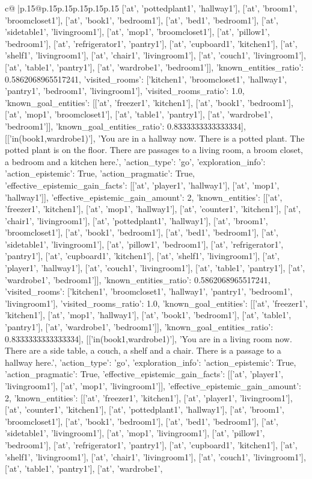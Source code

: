 \documentclass{article}
\begin{document}
{\begin{supertabular}{c@{$\;$}|p{.15\linewidth}@{}p{.15\linewidth}p{.15\linewidth}p{.15\linewidth}p{.15\linewidth}p{.15\linewidth}}
{{{['at', 'pottedplant1', 'hallway1'], ['at', 'broom1', 'broomcloset1'], ['at', 'book1', 'bedroom1'], ['at', 'bed1', 'bedroom1'], ['at', 'sidetable1', 'livingroom1'], ['at', 'mop1', 'broomcloset1'], ['at', 'pillow1', 'bedroom1'], ['at', 'refrigerator1', 'pantry1'], ['at', 'cupboard1', 'kitchen1'], ['at', 'shelf1', 'livingroom1'], ['at', 'chair1', 'livingroom1'], ['at', 'couch1', 'livingroom1'], ['at', 'table1', 'pantry1'], ['at', 'wardrobe1', 'bedroom1']], 'known_entities_ratio': 0.5862068965517241, 'visited_rooms': ['kitchen1', 'broomcloset1', 'hallway1', 'pantry1', 'bedroom1', 'livingroom1'], 'visited_rooms_ratio': 1.0, 'known_goal_entities': [['at', 'freezer1', 'kitchen1'], ['at', 'book1', 'bedroom1'], ['at', 'mop1', 'broomcloset1'], ['at', 'table1', 'pantry1'], ['at', 'wardrobe1', 'bedroom1']], 'known_goal_entities_ratio': 0.8333333333333334}}], [['in(book1,wardrobe1)'], 'You are in a hallway now. There is a potted plant. The potted plant is on the floor. There are passages to a living room, a broom closet, a bedroom and a kitchen here.', {'action_type': 'go', 'exploration_info': {'action_epistemic': True, 'action_pragmatic': True, 'effective_epistemic_gain_facts': [['at', 'player1', 'hallway1'], ['at', 'mop1', 'hallway1']], 'effective_epistemic_gain_amount': 2, 'known_entities': [['at', 'freezer1', 'kitchen1'], ['at', 'mop1', 'hallway1'], ['at', 'counter1', 'kitchen1'], ['at', 'chair1', 'livingroom1'], ['at', 'pottedplant1', 'hallway1'], ['at', 'broom1', 'broomcloset1'], ['at', 'book1', 'bedroom1'], ['at', 'bed1', 'bedroom1'], ['at', 'sidetable1', 'livingroom1'], ['at', 'pillow1', 'bedroom1'], ['at', 'refrigerator1', 'pantry1'], ['at', 'cupboard1', 'kitchen1'], ['at', 'shelf1', 'livingroom1'], ['at', 'player1', 'hallway1'], ['at', 'couch1', 'livingroom1'], ['at', 'table1', 'pantry1'], ['at', 'wardrobe1', 'bedroom1']], 'known_entities_ratio': 0.5862068965517241, 'visited_rooms': ['kitchen1', 'broomcloset1', 'hallway1', 'pantry1', 'bedroom1', 'livingroom1'], 'visited_rooms_ratio': 1.0, 'known_goal_entities': [['at', 'freezer1', 'kitchen1'], ['at', 'mop1', 'hallway1'], ['at', 'book1', 'bedroom1'], ['at', 'table1', 'pantry1'], ['at', 'wardrobe1', 'bedroom1']], 'known_goal_entities_ratio': 0.8333333333333334}}], [['in(book1,wardrobe1)'], 'You are in a living room now. There are a side table, a couch, a shelf and a chair. There is a passage to a hallway here.', {'action_type': 'go', 'exploration_info': {'action_epistemic': True, 'action_pragmatic': True, 'effective_epistemic_gain_facts': [['at', 'player1', 'livingroom1'], ['at', 'mop1', 'livingroom1']], 'effective_epistemic_gain_amount': 2, 'known_entities': [['at', 'freezer1', 'kitchen1'], ['at', 'player1', 'livingroom1'], ['at', 'counter1', 'kitchen1'], ['at', 'pottedplant1', 'hallway1'], ['at', 'broom1', 'broomcloset1'], ['at', 'book1', 'bedroom1'], ['at', 'bed1', 'bedroom1'], ['at', 'sidetable1', 'livingroom1'], ['at', 'mop1', 'livingroom1'], ['at', 'pillow1', 'bedroom1'], ['at', 'refrigerator1', 'pantry1'], ['at', 'cupboard1', 'kitchen1'], ['at', 'shelf1', 'livingroom1'], ['at', 'chair1', 'livingroom1'], ['at', 'couch1', 'livingroom1'], ['at', 'table1', 'pantry1'], ['at', 'wardrobe1', }}}
\end{supertabular}}
\end{document}

